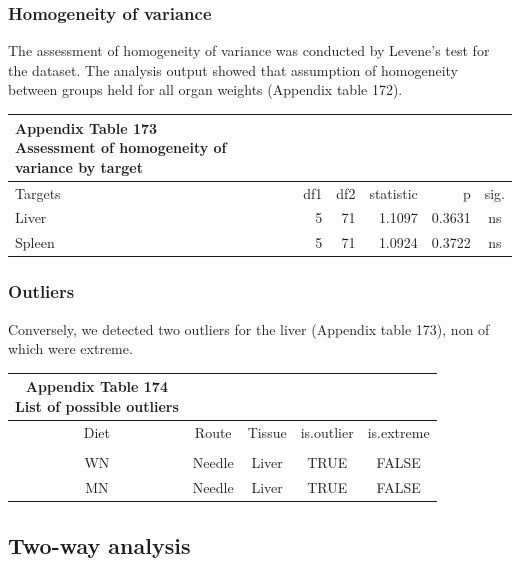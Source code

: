\documentclass[
  12pt,
  letterpaper,
]{article}
\begin{document}
\subsubsection{Homogeneity of variance}\label{homogeneity-of-variance-7}

The assessment of homogeneity of variance was conducted by Levene's test for the dataset. The analysis output showed that assumption of homogeneity between groups held for all organ weights (Appendix table 172).

\begingroup
\fontsize{12.0pt}{14.4pt}\selectfont
\begin{longtable}{l|rrrrc}
\caption*{
{\large \textbf{Appendix Table 173}} \\ 
{\small \textbf{Assessment of homogeneity of variance by target}}
} \\ 
\toprule
Targets & {df1} & {df2} & {statistic} & {p} & {sig.} \\ 
\midrule\addlinespace[2.5pt]
Liver & 5 & 71 & 1.1097 & 0.3631 & ns \\ 
Spleen & 5 & 71 & 1.0924 & 0.3722 & ns \\ 
\bottomrule
\end{longtable}
\endgroup

\subsubsection{Outliers}\label{outliers-7}

Conversely, we detected two outliers for the liver (Appendix table 173), non of which were extreme.

\begingroup
\fontsize{12.0pt}{14.4pt}\selectfont
\begin{longtable}{ccccc}
\caption*{
{\large \textbf{Appendix Table 174}} \\ 
{\small \textbf{List of possible outliers}}
} \\ 
\toprule
{Diet} & {Route} & {Tissue} & {is.outlier} & {is.extreme} \\ 
\midrule\addlinespace[2.5pt]
\multicolumn{5}{l}{Liver} \\[2.5pt] 
\midrule\addlinespace[2.5pt]
WN & Needle & Liver & TRUE & FALSE \\ 
MN & Needle & Liver & TRUE & FALSE \\ 
\bottomrule
\end{longtable}
\endgroup

\subsection{Two-way analysis}\label{two-way-analysis-3}
\end{document}
